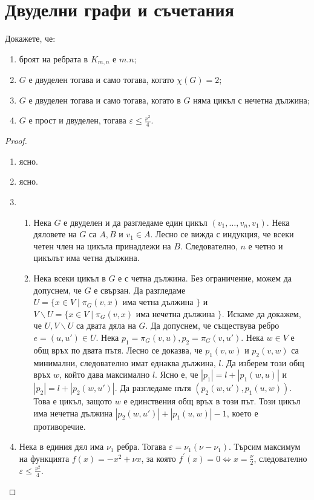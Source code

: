 \section{Двуделни графи и съчетания}

\begin{problem}
  Докажете, че:
 \begin{enumerate}
   \item
     броят на ребрата в $K_{m,n}$ е $m.n$;
   \item
     $G$ е двуделен тогава и само тогава, когато $\chi(G) = 2$;
   \item
     $G$ е двуделен тогава и само тогава, когато в $G$ няма цикъл с нечетна дължина;
   \item
     $G$ е прост и двуделен, тогава $\varepsilon \leq \frac{\nu^2}{4}$.
 \end{enumerate}
\end{problem}
\begin{proof}
  \begin{enumerate}
  \item
    ясно.
  \item
    ясно.
  \item
    \begin{enumerate}
    \item
      Нека $G$ е двуделен и да разгледаме един цикъл $(v_1,\dots,v_n,v_1)$.
      Нека дяловете на $G$ са $A,B$ и $v_1\in A$.
      Лесно се вижда с индукция, че всеки четен член на цикъла принадлежи на $B$.
      Следователно,  $n$ е четно и цикълът има четна дължина.
    \item
      Нека всеки цикъл в $G$ е с четна дължина.
      Без ограничение, можем да допуснем, че $G$ е свързан.
      Да разгледаме $U = \{x\in V\mid\pi_G(v,x) \mbox{ има четна дължина } \}$ и 
      $V\backslash U = \{x\in V\mid\pi_G(v,x) \mbox{ има нечетна дължина } \}$.
      Искаме да докажем, че $U, V\backslash U$ са двата дяла на $G$.
      Да допуснем, че съществува ребро $e=(u,u')\in U$.
      Нека $p_1 = \pi_G(v,u), p_2 = \pi_G(v,u')$.
      Нека $w\in V$  е общ връх по  двата пътя.
      Лесно се доказва, че $p_1(v,w)$ и $p_2(v,w)$ са минимални, следователно имат еднаква дължина, $l$.
      Да изберем този общ връх $w$, който дава максимално $l$.
      Ясно е, че $|p_1| = l + |p_1(w,u)|$ и $|p_2| = l + |p_2(w,u')|$.
      Да разгледаме пътя $(p_2(w,u'),p_1(u,w))$.  
      Това е цикъл, защото $w$ е единствения общ връх в този път.
      Този цикъл има нечетна дължина $|p_2(w,u')| + |p_1(u,w)| - 1$, което е противоречие.
    \end{enumerate}
  \item
    Нека в единия дял има $\nu_1$ ребра.
    Тогава $\varepsilon = \nu_1(\nu-\nu_1)$.
    Търсим максимум на функцията $f(x) = -x^2 + \nu x$, за която $f^{'}(x) = 0 \iff x = \frac{\nu}{2}$, 
    следователно $\varepsilon \leq \frac{\nu^2}{4}$.
  \end{enumerate}
\end{proof}

